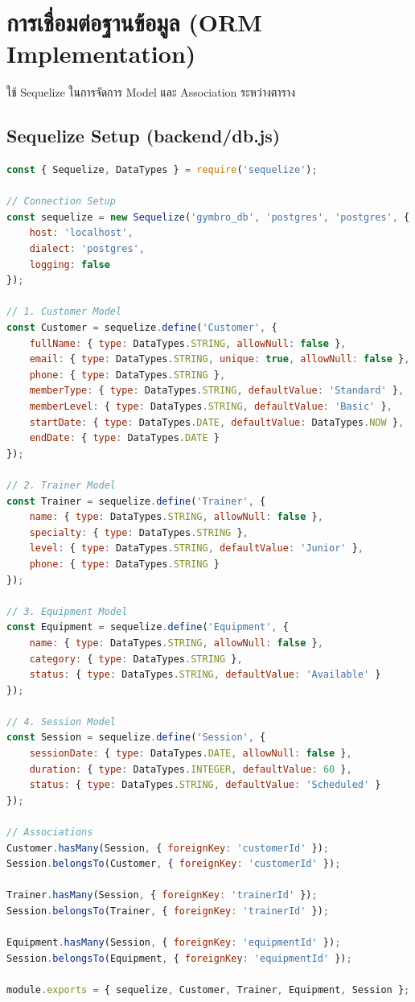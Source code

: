 \documentclass[12pt]{report}
\begin{document}
\section{การเชื่อมต่อฐานข้อมูล (ORM Implementation)}
ใช้ Sequelize ในการจัดการ Model และ Association ระหว่างตาราง

\subsection{Sequelize Setup (backend/db.js)}
\begin{lstlisting}[language=JavaScript, caption={การตั้งค่า Sequelize และ Models ใน backend/db.js}, label={code:backend-db}]
const { Sequelize, DataTypes } = require('sequelize');

// Connection Setup
const sequelize = new Sequelize('gymbro_db', 'postgres', 'postgres', {
    host: 'localhost',
    dialect: 'postgres',
    logging: false
});

// 1. Customer Model
const Customer = sequelize.define('Customer', {
    fullName: { type: DataTypes.STRING, allowNull: false },
    email: { type: DataTypes.STRING, unique: true, allowNull: false },
    phone: { type: DataTypes.STRING },
    memberType: { type: DataTypes.STRING, defaultValue: 'Standard' },
    memberLevel: { type: DataTypes.STRING, defaultValue: 'Basic' },
    startDate: { type: DataTypes.DATE, defaultValue: DataTypes.NOW },
    endDate: { type: DataTypes.DATE }
});

// 2. Trainer Model
const Trainer = sequelize.define('Trainer', {
    name: { type: DataTypes.STRING, allowNull: false },
    specialty: { type: DataTypes.STRING },
    level: { type: DataTypes.STRING, defaultValue: 'Junior' },
    phone: { type: DataTypes.STRING }
});

// 3. Equipment Model
const Equipment = sequelize.define('Equipment', {
    name: { type: DataTypes.STRING, allowNull: false },
    category: { type: DataTypes.STRING },
    status: { type: DataTypes.STRING, defaultValue: 'Available' }
});

// 4. Session Model
const Session = sequelize.define('Session', {
    sessionDate: { type: DataTypes.DATE, allowNull: false },
    duration: { type: DataTypes.INTEGER, defaultValue: 60 },
    status: { type: DataTypes.STRING, defaultValue: 'Scheduled' }
});

// Associations
Customer.hasMany(Session, { foreignKey: 'customerId' });
Session.belongsTo(Customer, { foreignKey: 'customerId' });

Trainer.hasMany(Session, { foreignKey: 'trainerId' });
Session.belongsTo(Trainer, { foreignKey: 'trainerId' });

Equipment.hasMany(Session, { foreignKey: 'equipmentId' });
Session.belongsTo(Equipment, { foreignKey: 'equipmentId' });

module.exports = { sequelize, Customer, Trainer, Equipment, Session };
\end{lstlisting}
\end{document}
